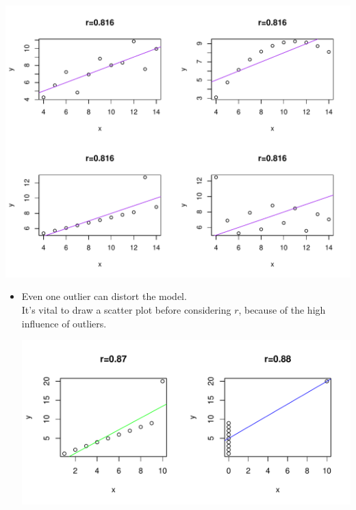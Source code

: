 \documentclass[t,xcolor=pdftex,dvipsnames,table]{beamer}\usepackage[]{graphicx}\usepackage[]{color}
\makeatletter
\def\maxwidth{ %
  \ifdim\Gin@nat@width>\linewidth
    \linewidth
  \else
    \Gin@nat@width
  \fi
}
\newenvironment{knitrout}{}{} %
\makeatother
\begin{document}
\begin{frame}[fragile]{}

\begin{knitrout}
\color{fgcolor}
\includegraphics[width=\maxwidth]{figure/unnamed-chunk-54-1} 

\end{knitrout}
\end{frame} 


\begin{frame}[fragile]{}

\begin{itemize}
\item Even one outlier can distort the model.  \\

It's vital to draw a scatter plot before considering $r$, because of the high influence of outliers.

\begin{knitrout}
\color{fgcolor}
\includegraphics[width=\maxwidth]{figure/unnamed-chunk-55-1} 

\end{knitrout}
\end{itemize}
\end{frame} 
\end{document}
